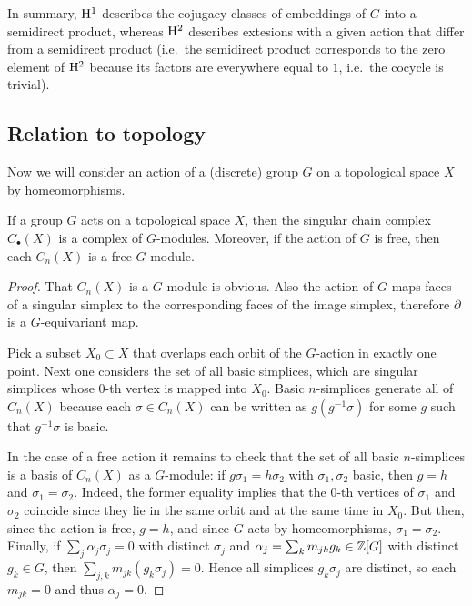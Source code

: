 In summary, $\mathrm{H}^1$ describes the cojugacy classes of embeddings of $G$ into a semidirect product, whereas $\mathrm{H}^2$ describes extesions with a given action that differ from a semidirect product (i.e.~the semidirect product corresponds to the zero element of $\mathrm{H}^2$ because its factors are everywhere equal to $1$, i.e.\ the cocycle is trivial).

\subsection{Relation to topology}

Now we will consider an action of a (discrete) group $G$
 on a topological space $X$ by homeomorphisms.

\begin{prop}
    If a group $G$ acts on a topological space $X$, then the singular chain complex $C_\bullet(X)$ is a complex of $G$-modules. Moreover, if the action of $G$ is free, then each $C_n(X)$ is a free $G$-module.
\end{prop}
\begin{proof}
    That $C_n(X)$ is a $G$-module is obvious. Also the action of $G$ maps faces of a singular simplex to the corresponding faces of the image simplex, therefore $\partial$ is a $G$-equivariant map.

    Pick a subset $X_0\subset X$ that overlaps each orbit of the $G$-action in exactly one point. Next one considers the set of all basic simplices, which are singular simplices whose $0$-th vertex is mapped into $X_0$. Basic $n$-simplices generate all of $C_n(X)$ because each $\sigma\in C_n(X)$ can be written as $g(g^{-1}\sigma)$ for some $g$ such that $g^{-1}\sigma$ is basic. 
    
    In the case of a free action it remains to check that the set of all basic $n$-simplices is a basis of $C_n(X)$ as a $G$-module: if $g\sigma_1=h\sigma_2$ with $\sigma_1,\sigma_2$ basic, then $g=h$ and $\sigma_1=\sigma_2$. Indeed, the  former equality implies that the $0$-th vertices of $\sigma_1$ and $\sigma_2$ coincide since they lie in the same orbit and at the same time in $X_0$. But then, since the action is free, $g=h$, and since $G$ acts by homeomorphisms, $\sigma_1=\sigma_2$. Finally, if $\sum_j\alpha_j\sigma_j=0$ with distinct $\sigma_j$ and $\alpha_j=\sum_km_{jk}g_k\in \mathbb{Z}[G]$ with distinct $g_k\in G$, then $\sum_{j,k}m_{jk}(g_k \sigma_j)=0$. Hence all simplices $g_k\sigma_j$ are distinct, so each $m_{jk}=0$ and thus $\alpha_j=0$.
\end{proof}

